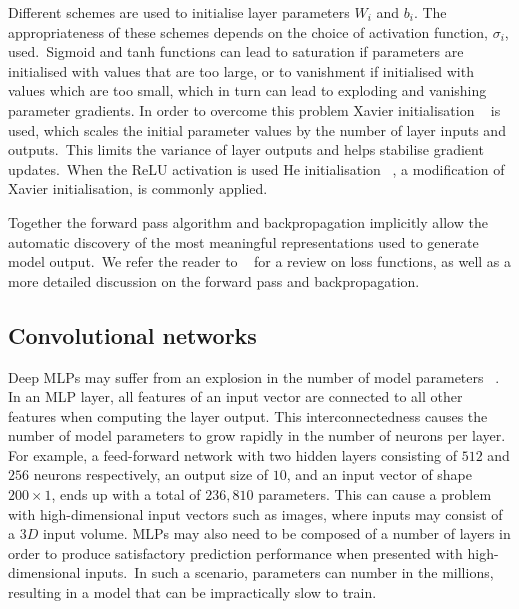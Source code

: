 \noindent Different schemes are used to initialise layer parameters $ W_i $ and $ b_i $. The appropriateness of these schemes depends on the choice of activation function, $ \sigma_i $, used.\ Sigmoid and tanh functions can lead to saturation if parameters are initialised with values that are too large, or to vanishment if initialised with values which are too small, which in turn can lead to exploding and vanishing parameter gradients. In order to overcome this problem Xavier initialisation \unskip ~\citep{glorot2010understanding} is used, which scales the initial parameter values by the number of layer inputs and outputs.\ This limits the variance of layer outputs and helps stabilise gradient updates.\ When the ReLU activation is used He initialisation \unskip ~\citep{he2015delving}, a modification of Xavier initialisation, is commonly applied. \par

\noindent Together the forward pass algorithm and backpropagation implicitly allow the automatic discovery of the most meaningful representations used to generate model output.\ We refer the reader to \unskip ~\citep{Goodfellow-et-al-2016} for a review on loss functions, as well as a more detailed discussion on the forward pass and backpropagation. 



\subsection{Convolutional networks}

Deep MLPs may suffer from an explosion in the number of model parameters \unskip ~\citep{krizhevsky2012imagenet}. In an MLP layer, all features of an input vector are connected to all other features when computing the layer output. This interconnectedness causes the number of model parameters to grow rapidly in the number of neurons per layer. For example, a feed-forward network with two hidden layers consisting of $ 512 $ and $ 256 $ neurons respectively, an output size of $10$, and an input vector of shape $ 200 \times 1 $, ends up with a total of $ 236,810 $ parameters. This can cause a problem with high-dimensional input vectors such as images, where inputs may consist of a $ 3D $ input volume. MLPs may also need to be composed of a number of layers in order to produce satisfactory prediction performance when presented with high-dimensional inputs.\ In such a scenario, parameters can number in the millions, resulting in a model that can be impractically slow to train. \par


